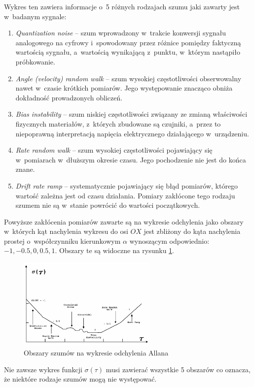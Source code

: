 Wykres ten zawiera informacje o~5 różnych rodzajach szumu jaki zawarty jest w~badanym sygnale:

\begin{enumerate}
	\item {\emph{Quantization noise} -- szum wprowadzony w~trakcie konwersji sygnału analogowego na cyfrowy i~spowodowany przez różnice pomiędzy faktyczną wartością sygnału, a~wartością wynikającą z~punktu, w~którym nastąpiło próbkowanie.}
	\item {\emph{Angle (velocity) random walk} -- szum wysokiej częstotliwości obserwowalny nawet w~czasie krótkich pomiarów. Jego występowanie znacząco obniża dokładność prowadzonych obliczeń.}
	\item {\emph{Bias instability} -- szum niskiej częstotliwości związany ze zmianą właściwości fizycznych materiałów, z~których zbudowane są czujniki, a~przez to niepoprawną interpretacją napięcia elektrycznego działającego w~urządzeniu.}
	\item {\emph{Rate random walk} -- szum wysokiej częstotliwości pojawiający się w~pomiarach w~dłuższym okresie czasu. Jego pochodzenie nie jest do końca znane.}
	\item {\emph{Drift rate ramp} -- systematycznie pojawiający się błąd pomiarów, którego wartość zależna jest od czasu działania. Pomiary zakłócone tego rodzaju szumem nie są w~stanie powrócić do wartości początkowych.}	
\end{enumerate}

Powyższe zakłócenia pomiarów zawarte są na wykresie odchylenia jako obszary w~których kąt nachylenia wykresu do osi $OX$ jest zbliżony do kąta nachylenia prostej o~współczynniku kierunkowym $\alpha$ wynoszącym odpowiednio: $-1, -0.5, 0, 0.5 , 1$. Obszary te są widoczne na rysunku \ref{fig:appx:allan:slopes}.
\begin{figure}
	\centering
	\includegraphics[width=0.6\textwidth]{images/slopes.png}
	\caption{Obszary szumów na wykresie odchylenia Allana \cite{FreescaleSemiconductor2015}}
	\label{fig:appx:allan:slopes}
\end{figure}

Nie zawsze wykres funkcji $\sigma(\tau)$ musi zawierać wszystkie 5 obszarów co oznacza, że niektóre rodzaje szumów mogą nie występować.

